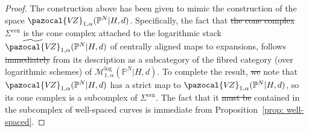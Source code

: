\documentclass[11pt]{amsart}
\newcommand{\VZ}{\pazocal{V\!Z}}
\theoremstyle{definition}
\theoremstyle{definition}
\providecommand{\DIFaddtex}[1]{{\protect\color{blue}\uwave{#1}}} %
\providecommand{\DIFdeltex}[1]{{\protect\color{red}\sout{#1}}}                      %
\providecommand{\DIFaddbegin}{} %
\providecommand{\DIFaddend}{} %
\providecommand{\DIFdelbegin}{} %
\providecommand{\DIFdelend}{} %
\providecommand{\DIFadd}[1]{\texorpdfstring{\DIFaddtex{#1}}{#1}} %
\providecommand{\DIFdel}[1]{\texorpdfstring{\DIFdeltex{#1}}{}} %
\begin{document}
\begin{proof}
The construction above has been given to mimic the construction of the space $
\VZ_{1,\alpha}(\mathbb P^N|H,d)$. Specifically, the fact that \DIFdelbegin \DIFdel{the cone complex }\DIFdelend $\Sigma^{\mathrm{cen}}$ is the cone complex attached to the logarithmic stack $\widetilde{\VZ}_{1,\alpha}(\mathbb P^N|H,d)$ of centrally aligned maps to expansions, follows \DIFdelbegin \DIFdel{immediately }\DIFdelend from its description as a subcategory of the fibred category (over logarithmic schemes) of $\mathcal M^{\mathrm{log}}_{1,\alpha}(\mathbb P^N|H,d)$. To complete the result, \DIFdelbegin \DIFdel{we }\DIFdelend note that $
\VZ_{1,\alpha}(\mathbb P^N|H,d)$ has a strict map to $
\VZ_{1,\alpha}(\mathbb P^N|H,d)$, so its cone complex is a subcomplex of $\Sigma^{\mathrm{cen}}$. The fact that it \DIFdelbegin \DIFdel{must be }\DIFdelend \DIFaddbegin \DIFadd{is }\DIFaddend contained in the subcomplex of well-spaced curves is immediate from Proposition~\ref{prop: well-spaced}.
\end{proof}
\end{document}
